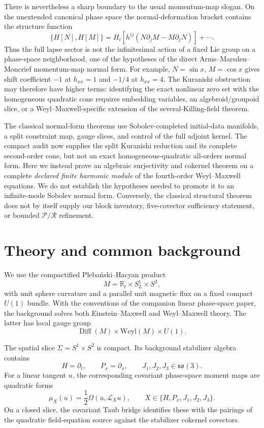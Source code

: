 \documentclass[11pt]{article}
\theoremstyle{definition}
\theoremstyle{remark}
\newcommand{\R}{\mathbb R}
\newcommand{\Diff}{\operatorname{Diff}}
\begin{document}
There is nevertheless a sharp boundary to the usual momentum-map slogan.  On
the unextended canonical phase space the normal-deformation bracket contains
the structure function
\[
 \{H[N],H[M]\}=H_i\!\left[h^{ij}
 (N\partial_jM-M\partial_jN)\right]+\cdots .
\]
Thus the full lapse sector is not the infinitesimal action of a fixed Lie group
on a phase-space neighborhood, one of the hypotheses of the direct
Arms--Marsden--Moncrief momentum-map normal form.  For example,
\(N=\sin x\), \(M=\cos x\) gives shift coefficient \(-1\) at \(h_{xx}=1\)
and \(-1/4\) at \(h_{xx}=4\).  The Kuranishi obstruction may therefore have
higher terms: identifying the exact nonlinear zero set with the homogeneous
quadratic cone requires embedding variables, an algebroid/groupoid slice, or a
Weyl--Maxwell-specific extension of the several-Killing-field theorem.

The classical normal-form theorems use Sobolev-completed initial-data
manifolds, a split constraint map, gauge slices, and control of the full
adjoint kernel.  The compact audit now supplies the split Kuranishi reduction
and its complete second-order cone, but not an exact homogeneous-quadratic
all-orders normal form.  Here we instead prove an
algebraic surjectivity and cokernel theorem on a complete \emph{declared
finite harmonic module} of the fourth-order Weyl--Maxwell equations.  We do
not establish the hypotheses needed to promote it to an infinite-mode
Sobolev normal form.  Conversely, the classical structural theorem does not
by itself supply our block inventory, five-covector sufficiency statement,
or bounded \(\mathcal P/\mathcal R\) refinement.

\section{Theory and common background}

We use the compactified Pleba\'nski--Hacyan product
\begin{equation}
 M=\R_t\times S^1_L\times S^2,
\end{equation}
with unit sphere curvature and a parallel unit magnetic flux on a fixed
compact \(U(1)\) bundle.  With the conventions of the companion linear
phase-space paper, the background solves both Einstein--Maxwell and
Weyl--Maxwell theory.  The latter has local gauge group
\[
 \Diff(M)\times\mathrm{Weyl}(M)\times U(1).
\]

The spatial slice \(\Sigma=S^1\times S^2\) is compact.  Its background
stabilizer algebra contains
\[
 H=\partial_t,\qquad P_x=\partial_x,\qquad
 J_1,J_2,J_3\in\mathfrak{so}(3).
\]
For a linear tangent \(u\), the corresponding covariant phase-space moment
maps are quadratic forms
\[
 \mu_X(u)=\frac12\Omega(u,\mathcal L_Xu),
 \qquad X\in\{H,P_x,J_1,J_2,J_3\}.
\]
On a closed slice, the covariant Taub bridge identifies these with the
pairings of the quadratic field-equation source against the stabilizer
cokernel covectors.
\end{document}
